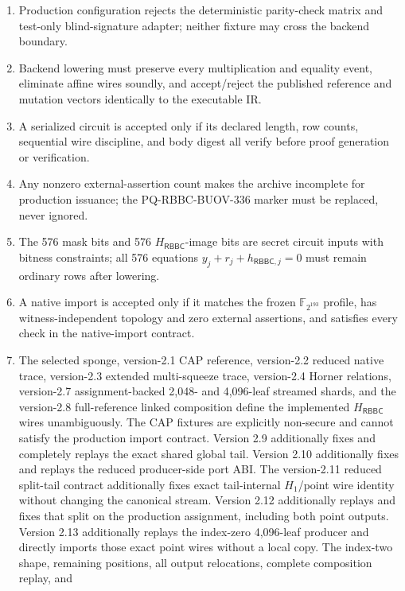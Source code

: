 \documentclass[11pt]{article}
\newcommand{\RBBC}{\mathsf{RBBC}}
\begin{document}
\begin{enumerate}[label=INV-\arabic*,leftmargin=*]
  backend meeting the stated zero-knowledge and simulation-extractability model
  is proved or substituted.
  \item Production configuration rejects the deterministic parity-check matrix
  and test-only blind-signature adapter; neither fixture may cross the backend
  boundary.
  \item Backend lowering must preserve every multiplication and equality event,
  eliminate affine wires soundly, and accept/reject the published reference and
  mutation vectors identically to the executable IR.
  \item A serialized circuit is accepted only if its declared length, row
  counts, sequential wire discipline, and body digest all verify before proof
  generation or verification.
  \item Any nonzero external-assertion count makes the archive incomplete for
  production issuance; the PQ-RBBC-BUOV-336 marker must be replaced, never ignored.
  \item The 576 mask bits and 576 $H_{\RBBC}$-image bits are secret circuit
  inputs with bitness constraints; all 576 equations $y_j+r_j+h_{\RBBC,j}=0$
  must remain ordinary rows after lowering.
  \item A native import is accepted only if it matches the frozen
  $\mathbb F_{2^{193}}$ profile, has witness-independent topology and zero
  external assertions, and satisfies every check in the native-import contract.
  \item The selected sponge, version-2.1 CAP reference, version-2.2 reduced
  native trace, version-2.3 extended multi-squeeze trace, version-2.4 Horner
  relations, version-2.7 assignment-backed 2,048- and 4,096-leaf streamed
  shards, and the version-2.8 full-reference linked composition define
  the implemented
  $H_{\RBBC}$ wires unambiguously.  The CAP fixtures are explicitly non-secure
  and cannot satisfy the production import contract.  Version 2.9 additionally
  fixes and completely replays the exact shared global tail.  Version 2.10
  additionally fixes and replays the reduced producer-side port ABI.  The
  version-2.11 reduced split-tail contract additionally fixes exact
  tail-internal $H_1$/point wire identity without changing the canonical
  stream.  Version 2.12 additionally replays and fixes that split on the
  production assignment, including both point outputs.  Version 2.13
  additionally replays the index-zero 4,096-leaf producer and directly imports
  those exact point wires without a local copy.  The index-two shape, remaining
  positions, all output relocations, complete composition replay, and

\end{enumerate}
\end{document}
